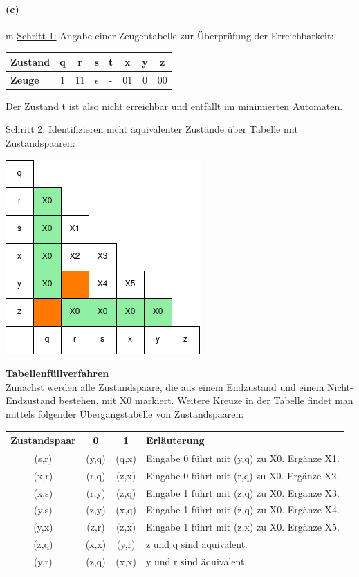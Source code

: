 \paragraph{(c)}m
	\underline{Schritt 1:} Angabe einer Zeugentabelle zur Überprüfung der Erreichbarkeit:

	\begin{tabular}{l|ccccccc}
		\textbf{Zustand} & q & r  & s          & t & x  & y & z \\
		\hline
		\textbf{Zeuge}   & 1 & 11 & $\epsilon$ & - & 01 & 0 & 00 \\
	\end{tabular} 
	
	Der Zustand t ist also nicht erreichbar und entfällt im minimierten Automaten.
	
	\underline{Schritt 2:} Identifizieren nicht äquivalenter Zustände über Tabelle mit Zustandspaaren:
	
	\includegraphics[scale=0.6]{thinf/sol/f23t2/Tabellenfuellverfahren}

	\textbf{Tabellenfüllverfahren} \\
	Zunächst werden alle Zustandspaare, die aus einem Endzustand und einem Nicht-Endzustand bestehen, mit X0 markiert. Weitere Kreuze in der Tabelle findet man mittels folgender Übergangstabelle von Zustandspaaren:

	\begin{tabular}{c|c|c|l}
		\textbf{Zustandspaar} & \textbf{0} & \textbf{1} & \textbf{Erläuterung} \\
		\hline
		(s,r)                 & (y,q)      & (q,x)      & Eingabe 0 führt mit (y,q) zu X0. Ergänze X1. \\
		\hline
		(x,r)                 & (r,q)      & (z,x)      & Eingabe 0 führt mit (r,q) zu X0. Ergänze X2. \\
		\hline
		(x,s)                 & (r,y)      & (z,q)      & Eingabe 1 führt mit (z,q) zu X0. Ergänze X3. \\
		\hline
		(y,s)                 & (z,y)      & (x,q)      & Eingabe 1 führt mit (z,q) zu X0. Ergänze X4. \\
		\hline
		(y,x)                 & (z,r)      & (z,x)      & Eingabe 1 führt mit (z,x) zu X0. Ergänze X5. \\
		\hline
		(z,q)                 & (x,x)      & (y,r)      & z und q sind äquivalent. \\
		\hline 		
		(y,r)                 & (z,q)      & (x,x)      & y und r sind äquivalent. \\
	\end{tabular} 
	
